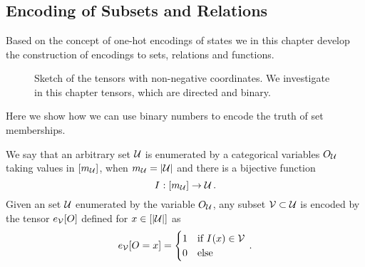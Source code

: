 \section{\chatextbasisCalculus}\label{cha:basisCalculus}


\subsection{Encoding of Subsets and Relations}

Based on the concept of one-hot encodings of states we in this chapter develop the construction of encodings to sets, relations and functions.

\begin{figure}[h]
	\begin{center}
		
	\end{center}
	\caption{Sketch of the tensors with non-negative coordinates. 
	We investigate in this chapter tensors, which are directed and binary.}
\end{figure}


Here we show how we can use binary numbers to encode the truth of set memberships.

\begin{definition}\label{def:subsetEncoding}
	We say that an arbitrary set $\mathcal{U}$ is enumerated by a categorical variables $O_{\mathcal{U}}$ taking values in $[m_{\mathcal{U}}]$, when $m_{\mathcal{U}}=\left|\mathcal{U}\right|$ and there is a bijective function
		\[ I^{} : [m_{\mathcal{U}}] \rightarrow \mathcal{U} \, . \]
	Given an set $\mathcal{U}$ enumerated by the variable $O_{\mathcal{U}}$, any subset $\mathcal{V}\subset\mathcal{U}$ is encoded by the tensor $e_{\mathcal{V}}[O]$ defined for $x\in[\left|\mathcal{U}\right|]$ as
	\begin{align}
	 	e_{\mathcal{V}}[O={x}] = \begin{cases}
		1 & \text{if } I^{}(x) \in \mathcal{V} \\
		0 & \text{else}
		\end{cases} \, . 
	\end{align}
\end{definition}

